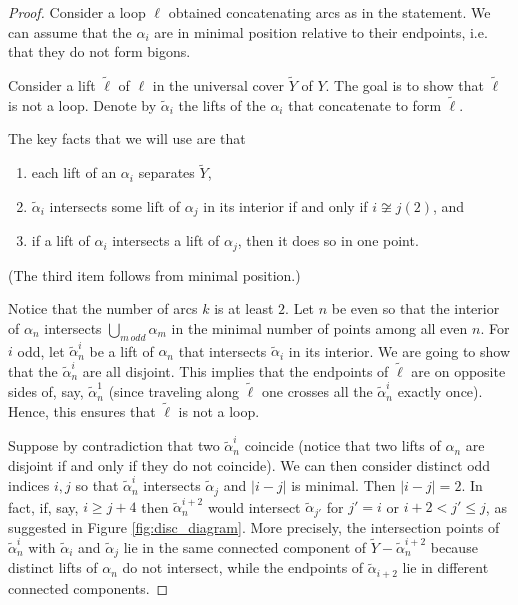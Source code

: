 \documentclass[11pt, oneside]{amsart}
\theoremstyle{definition}
\theoremstyle{definition}
\begin{document}
\begin{proof}
Consider a loop $\ell$ obtained concatenating arcs as in the statement. We can assume that the $\alpha_i$ are in minimal position relative to their endpoints, i.e. that they do not form bigons.

  Consider a lift $\tilde \ell$ of $\ell$ in the universal cover $\tilde Y$ of $Y$. The goal is to show that $\tilde\ell$ is not a loop. Denote by $\tilde\alpha_i$ the lifts of the $\alpha_i$ that concatenate to form $\tilde \ell$. 
 
 The key facts that we will use are that
 \begin{enumerate}
  \item each lift of an $\alpha_i$ separates $\tilde Y$,
  \item $\tilde\alpha_i$ intersects some lift of $\alpha_j$ in its interior if and only if $i\not\cong j (2)$, and
  \item if a lift of $\alpha_i$ intersects a lift of $\alpha_j$, then it does so in one point.
 \end{enumerate}

(The third item follows from minimal position.)
 
 Notice that the number of arcs $k$ is at least $2$. Let $n$ be even so that the interior of $\alpha_n$ intersects $\bigcup_{m\, odd}\alpha_m$ in the minimal number of points among all even $n$. For $i$ odd, let $\tilde \alpha^i_n$ be a lift of $\alpha_n$ that intersects $\tilde\alpha_i$ in its interior. We are going to show that the $\tilde\alpha^i_n$ are all disjoint. This implies that the endpoints of $\tilde\ell$ are on opposite sides of, say, $\tilde\alpha^1_n$ (since traveling along $\tilde\ell$ one crosses all the $\tilde\alpha^i_n$ exactly once). Hence, this ensures that $\tilde\ell$ is not a loop.
 
 Suppose by contradiction that two $\tilde\alpha^i_n$ coincide (notice that two lifts of $\alpha_n$ are disjoint if and only if they do not coincide). We can then consider distinct odd indices $i,j$ so that $\tilde\alpha^i_n$ intersects $\tilde\alpha_j$ and $|i-j|$ is minimal. Then $|i-j|=2$. In fact, if, say, $i\geq j+4$ then $\tilde\alpha^{i+2}_n$ would intersect $\tilde\alpha_{j'}$ for $j'=i$ or $i+2< j'\leq j$, as suggested in Figure \ref{fig:disc_diagram}. More precisely, the intersection points of $\tilde\alpha^i_n$ with $\tilde\alpha_i$ and $\tilde\alpha_j$ lie in the same connected component of $\tilde Y-\tilde\alpha^{i+2}_n$ because distinct lifts of $\alpha_n$ do not intersect, while the endpoints of $\tilde\alpha_{i+2}$ lie in different connected components.  


\end{proof}
\end{document}

